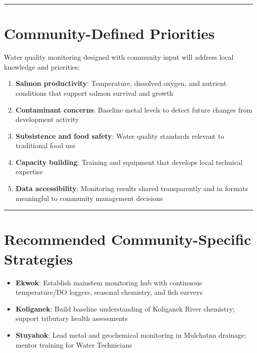 \documentclass[
  letterpaper,
]{scrbook}
\providecommand{\tightlist}{%
  \setlength{\itemsep}{0pt}\setlength{\parskip}{0pt}}\usepackage{longtable,booktabs,array}
\begin{document}
\begin{center}\rule{0.5\linewidth}{0.5pt}\end{center}

\section{Community-Defined
Priorities}\label{community-defined-priorities}

Water quality monitoring designed with community input will address
local knowledge and priorities:

\begin{enumerate}
\def\labelenumi{\arabic{enumi}.}
\tightlist
\item
  \textbf{Salmon productivity}: Temperature, dissolved oxygen, and
  nutrient conditions that support salmon survival and growth
\item
  \textbf{Contaminant concerns}: Baseline metal levels to detect future
  changes from development activity
\item
  \textbf{Subsistence and food safety}: Water quality standards relevant
  to traditional food use
\item
  \textbf{Capacity building}: Training and equipment that develops local
  technical expertise
\item
  \textbf{Data accessibility}: Monitoring results shared transparently
  and in formats meaningful to community management decisions
\end{enumerate}

\begin{center}\rule{0.5\linewidth}{0.5pt}\end{center}

\section{Recommended Community-Specific
Strategies}\label{recommended-community-specific-strategies}

\begin{itemize}
\tightlist
\item
  \textbf{Ekwok}: Establish mainstem monitoring hub with continuous
  temperature/DO loggers, seasonal chemistry, and fish surveys
\item
  \textbf{Koliganek}: Build baseline understanding of Koliganek River
  chemistry; support tributary health assessments
\item
  \textbf{Stuyahok}: Lead metal and geochemical monitoring in Mulchatna
  drainage; mentor training for Water Technicians
\end{itemize}
\end{document}
